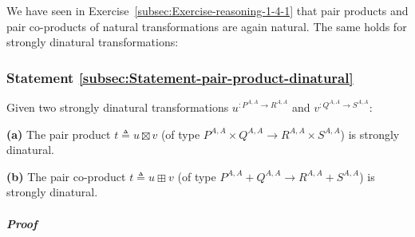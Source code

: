 We have seen in Exercise~\ref{subsec:Exercise-reasoning-1-4-1} that
pair products and pair co-products of natural transformations are
again natural. The same holds for strongly dinatural transformations:

\subsubsection{Statement \label{subsec:Statement-pair-product-dinatural}\ref{subsec:Statement-pair-product-dinatural}}

Given two strongly dinatural transformations $u^{:P^{A,A}\rightarrow R^{A,A}}$
and $v^{:Q^{A,A}\rightarrow S^{A,A}}$:

\textbf{(a)} The pair product $t\triangleq u\boxtimes v$ (of type
$P^{A,A}\times Q^{A,A}\rightarrow R^{A,A}\times S^{A,A}$) is strongly
dinatural.

\textbf{(b)} The pair co-product
$t\triangleq u\boxplus v$ (of type $P^{A,A}+Q^{A,A}\rightarrow R^{A,A}+S^{A,A}$)
is strongly dinatural.

\subparagraph{Proof}


